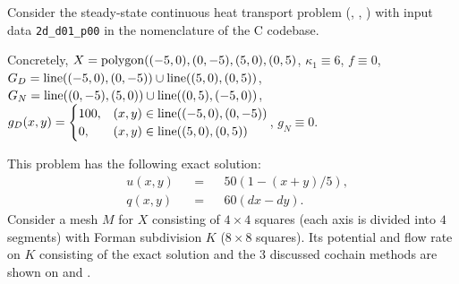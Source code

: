 \begin{example}
  \label{idec/diffusion/continuous/steady_state/examples/2d_d01_p00-example}
  Consider the steady-state continuous heat transport problem
  (,
   ,
   )
  with input data \verb|2d_d01_p00| in the nomenclature of the C codebase.

  Concretely,
    $X = {\rm polygon}((-5, 0), (0, -5), (5, 0), (0, 5)$,
    $\kappa_1 \equiv 6$,
    $f \equiv 0$,
    $G_D = {\rm line}((-5, 0), (0, -5)) \cup {\rm line}((5, 0), (0, 5))$,
    $G_N = {\rm line}((0, -5), (5, 0)) \cup {\rm line}((0, 5), (-5, 0))$,
    $g_D(x, y) =
      \begin{cases}
        100, & (x, y) \in {\rm line}((-5, 0), (0, -5)) \\
        0, & (x, y) \in {\rm line}((5, 0), (0, 5))
      \end{cases}$,
    $g_N \equiv 0$.

  This problem has the following exact solution:
  \begin{subequations}
    \begin{alignat}{3}
      & u(x, y) && = && 50 (1 - (x + y) / 5), \\
      & q(x, y) && = && 60 (d x - d y).
    \end{alignat}
  \end{subequations}
  Consider a mesh $M$ for $X$ consisting of $4 \times 4$ squares (each axis is
  divided into $4$ segments) with Forman subdivision $K$ ($8 \times 8$ squares).
  Its potential and flow rate on $K$ consisting of the exact solution and the
  $3$ discussed cochain methods are shown on
  and
  .
\end{example}
